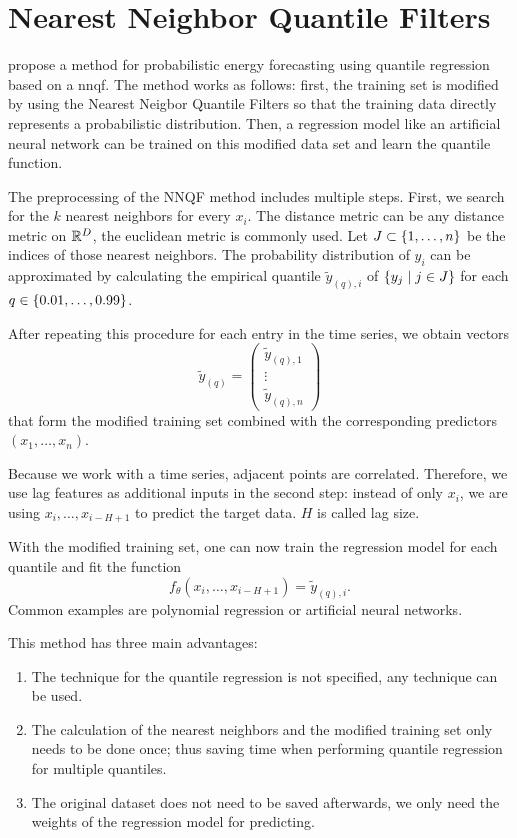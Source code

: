 \section{Nearest Neighbor Quantile Filters}
\label{sec:nnqf}

\Textcite{Ordiano2019} propose a method for probabilistic 
energy forecasting using quantile regression based on a \gls{nnqf}. 
The method works as follows: first, the training set is modified 
by using the Nearest Neigbor Quantile Filters so that 
the training data directly represents a probabilistic distribution. 
Then, a regression model like an artificial neural network can 
be trained on this modified data set and learn the quantile function.

The preprocessing of the NNQF method includes multiple steps. 
First, we search for the \(k\) nearest neighbors 
for every \(x_i\).
The distance metric can be any distance metric on \(\mathbb{R}^D\), 
the euclidean metric is commonly used.
Let \(J \subset \{1, \ldots, n\}\) be the indices of 
those nearest neighbors. 
The probability distribution of \(y_i\) can be approximated 
by calculating the empirical quantile \(\tilde{y}_{(q),i}\) of 
\(\{y_j \;|\; j\in J\}\) for each \(q \in \{0.01, \ldots, 0.99\}\). 

After repeating this procedure for each entry in the time series, 
we obtain vectors 
\[ \tilde{y}_{(q)} = \begin{pmatrix}
    \tilde{y}_{(q), 1} \\ 
    \vdots \\
    \tilde{y}_{(q), n}
\end{pmatrix} \]
that form the modified training set combined with the corresponding 
predictors \((x_1, \ldots, x_n)\).

Because we work with a time series, adjacent points are correlated. 
Therefore, we use lag features as additional inputs in the second step: 
instead of only \(x_i\), we are using \(x_i, \ldots, x_{i-H+1}\) to 
predict the target data. \(H\) is called lag size.

With the modified training set, one can now train the regression model 
for each quantile and fit the function 
\[ f_\theta(x_i, \ldots, x_{i-H+1}) = \tilde{y}_{(q), i}. \]
Common examples are polynomial regression or 
artificial neural networks. 

This method has three main advantages: 
\begin{enumerate}
    \item The technique for the quantile regression is not specified, 
    any technique can be used.
    \item The calculation of the nearest neighbors and the modified 
    training set only needs to be done once; thus saving time when 
    performing quantile regression for multiple quantiles. 
    \item The original dataset does not need to be saved afterwards, 
    we only need the weights of the regression model for predicting.
\end{enumerate}

